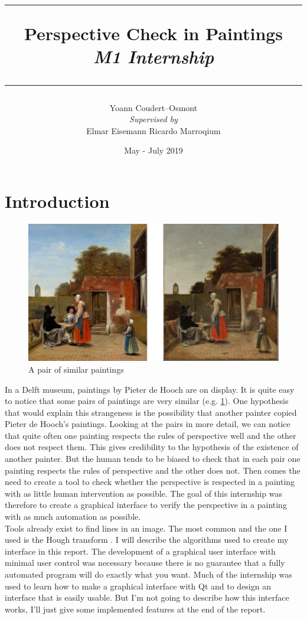 \documentclass{article}
\title{
	\rule{\linewidth}{0.4mm}
	\textbf{Perspective Check in Paintings} \\
	\textit{M1 Internship}
	\rule{\linewidth}{0.6mm}
}
\author{
	Yoann Coudert--Osmont \\[3mm]
	\textit{Supervised by} \\
	Elmar Eisemann \qquad Ricardo Marroqium \\[2mm]
}
\date{May - July 2019}
\begin{document}
	\maketitle
	
	\section*{Introduction}
	
	\begin{figure}
		\centering
		\includegraphics[scale=1.25]{paintings_pair.jpg}
		\caption{A pair of similar paintings}
		\label{im:pair}
	\end{figure}

	In a Delft museum, paintings by Pieter de Hooch are on display. It is quite easy to notice that some pairs of paintings are very similar (e.g. \figurename \ref{im:pair}). One hypothesis that would explain this strangeness is the possibility that another painter copied Pieter de Hooch's paintings. Looking at the pairs in more detail, we can notice that quite often one painting respects the rules of perspective well and the other does not respect them. This gives credibility to the hypothesis of the existence of another painter. But the human tends to be biased to check that in each pair one painting respects the rules of perspective and the other does not. Then comes the need to create a tool to check whether the perspective is respected in a painting with as little human intervention as possible. The goal of this internship was therefore to create a graphical interface to verify the perspective in a painting with as much automation as possible. \\
	Tools already exist to find lines in an image. The most common and the one I used is the Hough transform \cite{hough}. I will describe the algorithms used to create my interface in this report. The development of a graphical user interface with minimal user control was necessary because there is no guarantee that a fully automated program will do exactly what you want. Much of the internship was used to learn how to make a graphical interface with Qt and to design an interface that is easily usable. But I'm not going to describe how this interface works, I'll just give some implemented features at the end of the report.
\end{document}
